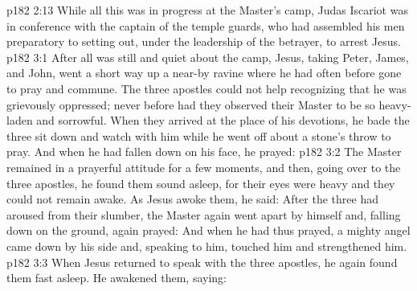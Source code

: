 \vs p182 2:13 \pc While all this was in progress at the Master’s camp, Judas Iscariot was in conference with the captain of the temple guards, who had assembled his men preparatory to setting out, under the leadership of the betrayer, to arrest Jesus.
\vs p182 3:1 After all was still and quiet about the camp, Jesus, taking Peter, James, and John, went a short way up a near\hyp{}by ravine where he had often before gone to pray and commune. The three apostles could not help recognizing that he was grievously oppressed; never before had they observed their Master to be so heavy\hyp{}laden and sorrowful. When they arrived at the place of his devotions, he bade the three sit down and watch with him while he went off about a stone’s throw to pray. And when he had fallen down on his face, he prayed: 
\vs p182 3:2 The Master remained in a prayerful attitude for a few moments, and then, going over to the three apostles, he found them sound asleep, for their eyes were heavy and they could not remain awake. As Jesus awoke them, he said:  After the three had aroused from their slumber, the Master again went apart by himself and, falling down on the ground, again prayed:  And when he had thus prayed, a mighty angel came down by his side and, speaking to him, touched him and strengthened him.
\vs p182 3:3 When Jesus returned to speak with the three apostles, he again found them fast asleep. He awakened them, saying: 
